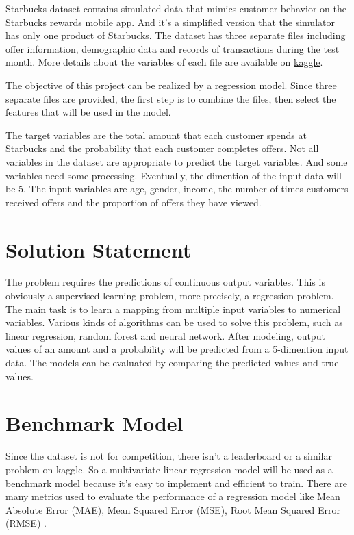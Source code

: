 \documentclass[a4paper,12pt]{article}
\begin{document}
Starbucks dataset contains simulated data that mimics customer behavior on the Starbucks rewards mobile app. And it's a 
simplified version that the simulator has only one product of Starbucks. The dataset has three separate files including offer 
information, demographic data and records of transactions during the test month. More details about the variables of each 
file are available on \href{https://www.kaggle.com/datasets/blacktile/starbucks-app-customer-reward-program-data}{kaggle}.

The objective of this project can be realized by a regression model. Since three separate files are provided, the first step
is to combine the files, then select the features that will be used in the model. 

The target variables are the total amount that each customer spends at Starbucks and the probability that each customer 
completes offers. Not all variables in the dataset are appropriate to predict the target variables. And some variables need 
some processing. Eventually, the dimention of the input data will be 5. The input variables are age, gender, income, the 
number of times customers received offers and the proportion of offers they have viewed.

\section{Solution Statement}

The problem requires the predictions of continuous output variables. This is obviously a supervised learning problem, more 
precisely, a regression problem. The main task is to learn a mapping from multiple input variables to numerical variables. 
Various kinds of algorithms can be used to solve this problem, such as linear regression, random forest and neural 
network. After modeling, output values of an amount and a probability will be predicted from a 5-dimention input data. The 
models can be evaluated by comparing the predicted values and true values.

\section{Benchmark Model}

Since the dataset is not for competition, there isn't a leaderboard or a similar problem on kaggle. So a multivariate linear 
regression model will be used as a benchmark model because it's easy to implement and efficient to train. There are many 
metrics used to evaluate the performance of a regression model like Mean Absolute Error (MAE), Mean Squared Error (MSE), Root 
Mean Squared Error (RMSE) \cite{metric}.
\end{document}
